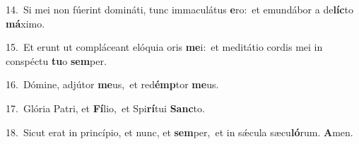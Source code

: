 {\numbfont\textcolor{\numbcolor}{14.}}~Si mei non fúerint domináti, tunc immaculátus \textbf{e}\-ro:~\star et emundábor a de\-\textbf{líc}\-to \textbf{má}\-ximo.\par
{\numbfont\textcolor{\numbcolor}{15.}}~Et erunt ut compláceant elóquia oris \textbf{me}\-i:~\star et meditátio cordis mei in conspéctu \textbf{tu}\-o \textbf{sem}\-per.\par
{\numbfont\textcolor{\numbcolor}{16.}}~Dómine, adjútor \textbf{me}\-us,~\star et red\-\textbf{émp}\-tor \textbf{me}\-us.\par
{\numbfont\textcolor{\numbcolor}{17.}}~Glória Patri, et \textbf{Fí}\-lio,~\star et Spi\-\textbf{rí}\-tui \textbf{Sanc}\-to.\par
{\numbfont\textcolor{\numbcolor}{18.}}~Sicut erat in princípio, et nunc, et \textbf{sem}\-per,~\star et in sǽcula sæcu\-\textbf{ló}\-rum. \textbf{A}\-men.\par
